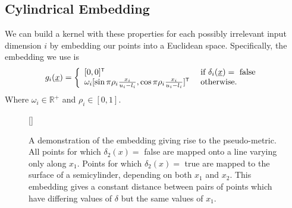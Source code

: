 \documentclass{article}
\newcommand{\vect}[1]{\underline{\smash{#1}}}
\renewcommand{\v}[1]{\vect{#1}}
\newcommand{\reals}{\mathds{R}}
\newcommand{\sX}{\mathcal{X}}
\newcommand{\br}{}%
\newcommand\transpose{{\textrm{\tiny{\sf{T}}}}}
\newcommand{\embeddingletter}{g}
\begin{document}
%


\subsection{Cylindrical Embedding}
\vspace{-0.05in} 

We can build a kernel with these properties for each possibly irrelevant input dimension $i$ by embedding our points into a Euclidean space.  Specifically, the embedding we use is
%
%
%
\begin{equation}
\embeddingletter_i\br(\v{x}) = \left\{\begin{array}{ll}
[0,0]^\transpose & \textrm{ if } \delta_i(\v{x}) = \textrm{ false }\\
\omega_i [\sin{\pi\rho_i\frac{x_i}{u_i-l_i}}, \cos{\pi\rho_i\frac{x_i}{u_i-l_i}}]^\transpose & \textrm{ otherwise.}\end{array}\right.
\label{eq:embedding}
\end{equation}
Where $\omega_i \in \mathbb{R}^+$ and $\rho_i \in [0,1]$.
%
\begin{figure}
	[\FBwidth]
	{\caption{A demonstration of the embedding giving rise to the pseudo-metric.  All points for which $\delta_2(x) =$ false are mapped onto a line varying only along $x_1$.  Points for which $\delta_2(x) =$ true are mapped to the surface of a semicylinder, depending on both $x_1$ and $x_2$.  This embedding gives a constant distance between pairs of points which have differing values of $\delta$ but the same values of $x_1$.}}
	{\hspace{-1cm}\label{fig:cylinder}}

\end{figure}
\end{document}

